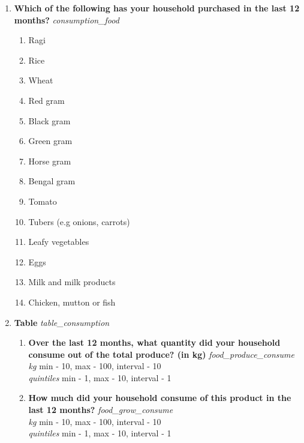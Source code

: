 \documentclass{article}
\begin{document}
\begin{enumerate}
\item {\bfseries Which of the following has your household purchased in the last 12 months?}\emph{ consumption\_food }
\begin{enumerate}
\item Ragi
\item Rice
\item Wheat
\item Red gram
\item Black gram
\item Green gram
\item Horse gram
\item Bengal gram
\item Tomato
\item Tubers (e.g onions, carrots)
\item Leafy vegetables
\item Eggs
\item Milk and milk products
\item Chicken, mutton or fish
\end{enumerate}
\item {\bfseries Table}\emph{ table\_consumption }
\begin{enumerate}[label*=\arabic*.]
\item {\bfseries Over the last 12 months, what quantity did your household consume out of the total produce? (in kg)}\emph{ food\_produce\_consume }
\\ \emph{ kg }min - 10, max - 100, interval - 10
\\ \emph{ quintiles }min - 1, max - 10, interval - 1

\item {\bfseries How much did your household consume of this product in the last 12 months?}\emph{ food\_grow\_consume }
\\ \emph{ kg }min - 10, max - 100, interval - 10
\\ \emph{ quintiles }min - 1, max - 10, interval - 1


\end{enumerate}
\end{enumerate}
\end{document}
